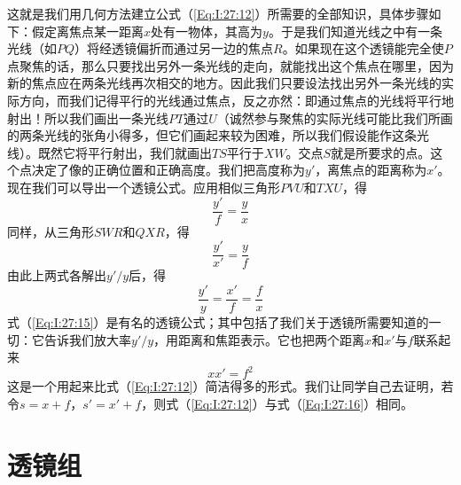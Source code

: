 这就是我们用几何方法建立公式（\ref{Eq:I:27:12}）所需要的全部知识，具体步骤如下：假定离焦点某一距离$x$处有一物体，其高为$y$。于是我们知道光线之中有一条光线（如$PQ$）将经透镜偏折而通过另一边的焦点$R$。如果现在这个透镜能完全使$P$点聚焦的话，那么只要找出另外一条光线的走向，就能找出这个焦点在哪里，因为新的焦点应在两条光线再次相交的地方。因此我们只要设法找出另外一条光线的实际方向，而我们记得平行的光线通过焦点，反之亦然：即通过焦点的光线将平行地射出！所以我们画出一条光线$PT$通过$U$（诚然参与聚焦的实际光线可能比我们所画的两条光线的张角小得多，但它们画起来较为困难，所以我们假设能作这条光线）。既然它将平行射出，我们就画出$TS$平行于$XW$。交点$S$就是所要求的点。这个点决定了像的正确位置和正确高度。我们把高度称为$y'$，离焦点的距离称为$x'$。现在我们可以导出一个透镜公式。应用相似三角形$PVU$和$TXU$，得
\begin{equation}
    \label{Eq:I:27:13}
    \frac{y'}{f} = \frac{y}{x}
\end{equation}
同样，从三角形$SWR$和$QXR$，得
\begin{equation}
    \label{Eq:I:27:14}
    \frac{y'}{x'} = \frac{y}{f}
\end{equation}
由此上两式各解出$y'/y$后，得
\begin{equation}
    \label{Eq:I:27:15}
    \frac{y'}{y} = \frac{x'}{f} = \frac{f}{x}
\end{equation}
式（\ref{Eq:I:27:15}）是有名的透镜公式；其中包括了我们关于透镜所需要知道的一切：它告诉我们放大率$y'/y$，用距离和焦距表示。它也把两个距离$x$和$x'$与$f$联系起来
\begin{equation}
    \label{Eq:I:27:16}
    xx'=f^2
\end{equation}
这是一个用起来比式（\ref{Eq:I:27:12}）简洁得多的形式。我们让同学自己去证明，若令$s=x+f$，$s'=x'+f$，则式（\ref{Eq:I:27:12}）与式（\ref{Eq:I:27:16}）相同。

\section{透镜组}

